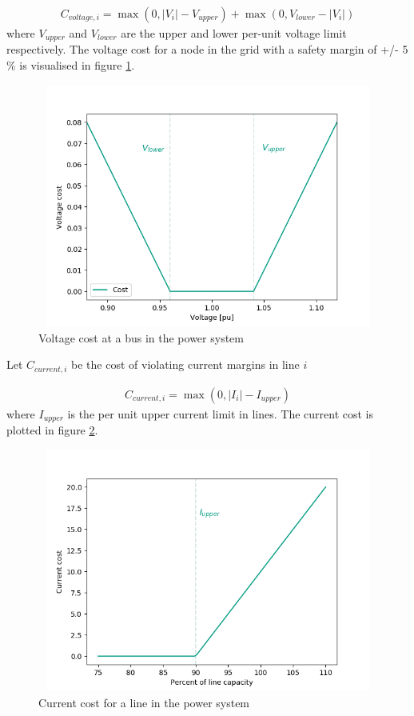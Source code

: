 \documentclass[class=book, crop=false]{standalone}
\begin{document}
\begin{equation}
   \begin{aligned}
   \label{eq:problem:voltage_margins_cost}
    C_{voltage,i} = \max(0,|V_{i}| - V_{upper}) + \max(0,V_{lower}- |V_{i}|)
    \end{aligned} 
\end{equation}
where $V_{upper}$ and $V_{lower}$ are the upper and lower per-unit voltage limit respectively. The voltage cost for a node in the grid with a safety margin of +/- 5 \%  is visualised in figure \ref{fig:problem:voltage_cost}.
\begin{figure}[ht]
    \center
\includegraphics[height=8cm, width=12cm]{figures/voltage_cost.png}
    \caption[size = 9]{Voltage cost at a bus in the power system}
    \label{fig:problem:voltage_cost}
\end{figure}

Let $C_{current,i}$ be the cost of violating current margins in line $i$

\begin{equation}
   \begin{aligned}
   \label{eq:problem:current_margins_cost}
    C_{current,i} = \max(0,|I_{i}| - I_{upper})
    \end{aligned} 
\end{equation}
where $I_{upper}$ is the per unit upper current limit in lines. The current cost is plotted in figure  \ref{fig:problem:current_cost}.

\begin{figure}[ht]
    \center
\includegraphics[height=8cm, width=12cm]{figures/current_cost.png}
    \caption[size = 9]{Current cost for a line in the power system}
    \label{fig:problem:current_cost}
\end{figure}
\end{document}
